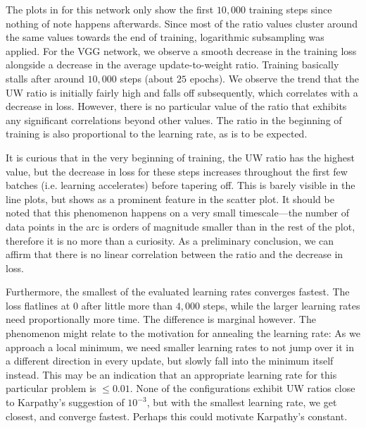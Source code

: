The plots in for this network only show the first $10,000$ training steps since
nothing of note happens afterwards. Since most of the ratio values cluster
around the same values towards the end of training, logarithmic subsampling was
applied.  For the VGG network, we observe a smooth decrease in the training loss
alongside a decrease in the average update-to-weight ratio. Training basically
stalls after around $10,000$ steps (about $25$ epochs).  We observe the trend
that the UW ratio is initially fairly high and falls off subsequently, which
correlates with a decrease in loss. However, there is no particular value of the
ratio that exhibits any significant correlations beyond other values. The
ratio in the beginning of training is also proportional to the learning rate, as
is to be expected.

It is curious that in the very beginning of training, the UW ratio has the
highest value, but the decrease in loss for these steps increases throughout the
first few batches (i.e. learning accelerates) before tapering off. This is
barely visible in the line plots, but shows as a prominent feature in the
scatter plot. It should be noted that this phenomenon happens on a very small
timescale---the number of data points in the arc is orders of magnitude smaller
than in the rest of the plot, therefore it is no more than a curiosity. As a
preliminary conclusion, we can affirm that there is no linear correlation
between the ratio and the decrease in loss.

Furthermore, the smallest of the evaluated learning rates converges fastest.
The loss flatlines at $0$ after little more than $4,000$ steps, while the larger
learning rates need proportionally more time. The difference is marginal
however. The phenomenon might relate to the motivation for annealing the
learning rate: As we approach a local minimum, we need smaller learning rates to
not jump over it in a different direction in every update, but slowly fall into
the minimum itself instead. This may be an indication that an appropriate learning rate
for this particular problem is $\le 0.01$. None of the configurations exhibit UW
ratios close to Karpathy's suggestion of $10^{-3}$, but with the smallest
learning rate, we get closest, and converge fastest. Perhaps this could motivate
Karpathy's constant.

